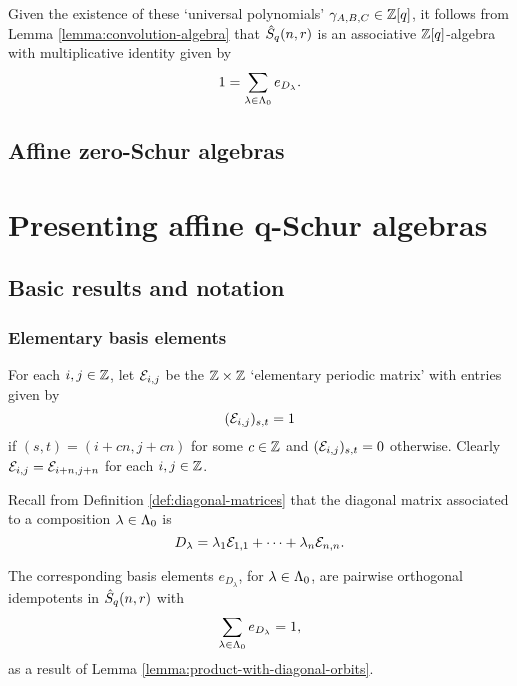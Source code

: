 \documentclass[a4paper, 11pt]{report}
\begin{document}
Given the existence of these `universal polynomials' $\gamma_{A,B,C}\in\mathbb{Z}[q]$, it follows from Lemma \ref{lemma:convolution-algebra} that $\hat{S}_q(n,r)$ is an associative $\mathbb{Z}[q]$-algebra with multiplicative identity given by
\begin{equation*}
1 = \sum_{\lambda\in\Lambda_0{}} e_{D_\lambda}.
\end{equation*}

\section{Affine zero-Schur algebras}


\chapter{Presenting affine q-Schur algebras}

\section{Basic results and notation}

\subsection{Elementary basis elements}

For each $i,j\in\mathbb{Z}$, let $\mathcal{E}_{i,j}$ be the $\mathbb{Z}\times\mathbb{Z}$ `elementary periodic matrix' with entries given by
\begin{equation*}
(\mathcal{E}_{i,j})_{s,t}=1
\end{equation*}
if $(s,t) = (i+cn,j+cn)$ for some $c\in\mathbb{Z}$ and $(\mathcal{E}_{i,j})_{s,t}=0$ otherwise. Clearly $\mathcal{E}_{i,j} = \mathcal{E}_{i+n,j+n}$ for each $i,j\in\mathbb{Z}$. 

Recall from Definition \ref{def:diagonal-matrices} that the diagonal matrix associated to a composition $\lambda\in\Lambda_0{}$ is
\begin{equation*}
D_\lambda = \lambda_1\mathcal{E}_{1,1} +\cdots + \lambda_n\mathcal{E}_{n,n}.
\end{equation*}

The corresponding basis elements $e_{D_\lambda}$, for $\lambda\in\Lambda_0{}$, are pairwise orthogonal idempotents in $\hat{S}_q(n,r)$ with
\begin{equation*}
\sum_{\lambda\in\Lambda_0{}}e_{D_\lambda} = 1,
\end{equation*}
as a result of Lemma \ref{lemma:product-with-diagonal-orbits}.
\end{document}
